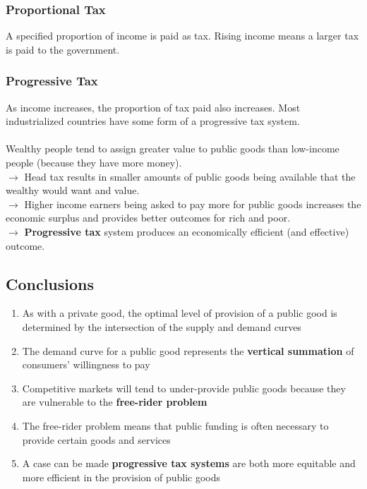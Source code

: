 \subsubsection{Proportional Tax}
A specified proportion of income is paid as tax. Rising income means a larger tax is paid to the government.

\subsubsection{Progressive Tax}
As income increases, the proportion of tax paid also increases. Most industrialized countries have some form of a progressive tax system.\\\\

Wealthy people tend to assign greater value to public goods than low-income people (because they have more money).\\
$\rightarrow$ Head tax results in smaller amounts of public goods being available that the wealthy would want and value.\\
$\rightarrow$ Higher income earners being asked to pay more for public goods increases the economic surplus and provides better outcomes for rich and poor.\\
$\rightarrow$ \textbf{Progressive tax} system produces an economically efficient (and effective) outcome.

\subsection{Conclusions}
\begin{enumerate}
	\item As with a private good, the optimal level of provision of a public good is determined by the intersection of the supply and demand curves
	\item The demand curve for a public good represents the \textbf{vertical summation} of consumers' willingness to pay
	\item Competitive markets will tend to under-provide public goods because they are vulnerable to the \textbf{free-rider problem}
	\item The free-rider problem means that public funding is often necessary to provide certain goods and services
	\item A case can be made \textbf{progressive tax systems} are both more equitable and more efficient in the provision of public goods
\end{enumerate}